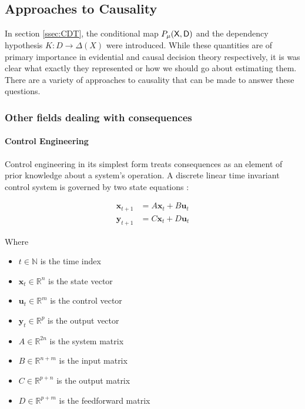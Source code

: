
\subsection{Approaches to Causality}

In section \ref{ssec:CDT}, the conditional map $P_\mu(\mathsf{X},\mathsf{D})$ and the dependency hypothesis $K:D\to\Delta(X)$ were introduced. While these quantities are of primary importance in evidential and causal decision theory respectively, it is was clear what exactly they represented or how we should go about estimating them. There are a variety of approaches to causality that can be made to answer these questions. 

\subsubsection{Other fields dealing with consequences}

\paragraph{Control Engineering}

Control engineering in its simplest form treats consequences as an element of prior knowledge about a system's operation. A discrete linear time invariant control system is governed by two state equations \cite{ogata_discrete-time_1995,nise_control_2010}:

\begin{align}
    \mathbf{x}_{t+1} &= A\mathbf{x}_t + B\mathbf{u}_t\\
    \mathbf{y}_{t+1} &= C\mathbf{x}_t + D\mathbf{u}_t
\end{align}

Where 
\begin{itemize}
    \item $t\in \mathbb{N}$ is the time index
    \item $\mathbf{x}_t \in \mathbb{R}^n$ is the state vector
    \item $\mathbf{u}_t \in \mathbb{R}^m$ is the control vector
    \item $\mathbf{y}_t \in \mathbb{R}^p$ is the output vector
    \item $A\in \mathbb{R}^{2n}$ is the system matrix
    \item $B\in \mathbb{R}^{n+m}$ is the input matrix
    \item $C\in \mathbb{R}^{p+n}$ is the output matrix
    \item $D\in \mathbb{R}^{p+m}$ is the feedforward matrix
\end{itemize}

